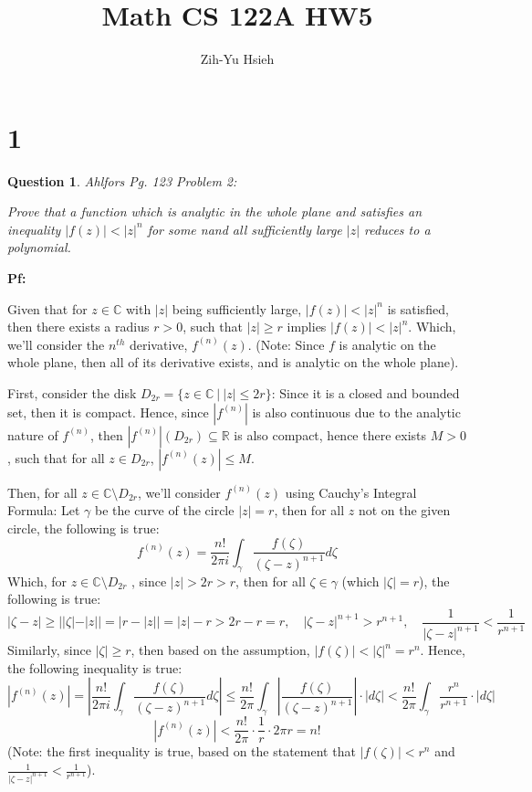 \documentclass{article}
\title{Math CS 122A HW5}
\author{Zih-Yu Hsieh}
\newtheorem{question}{Question}
\begin{document}
\maketitle

\section*{1}
\begin{myBox}[]{}
    \begin{question}
        Ahlfors Pg. 123 Problem 2:

        Prove that a function which is analytic in the whole plane and
        satisfies an inequality $|f(z)| < |z|^n$ for some nand all sufficiently large $|z|$
        reduces to a polynomial.
    \end{question}
\end{myBox}

\textbf{Pf:}

Given that for $z\in\mathbb{C}$ with $|z|$ being sufficiently large, $|f(z)|< |z|^n$ is satisfied, 
then there exists a radius $r>0$, such that $|z|\geq r$ implies $|f(z)|<|z|^n$. Which, we'll consider the $n^{th}$ derivative,
$f^{(n)}(z)$. (Note: Since $f$ is analytic on the whole plane, then all of its derivative exists, and is analytic on the whole plane).

\hfill

First, consider the disk $D_{2r} = \{z\in\mathbb{C}\ |\ |z|\leq 2r\}$: Since it is a closed and bounded set,
then it is compact. Hence, since $|f^{(n)}|$ is also continuous due to the analytic nature of $f^{(n)}$, 
then $|f^{(n)}|(D_{2r}) \subseteq \mathbb{R}$ is also compact, hence there exists $M>0$, such that for all $z\in D_{2r}$,
$|f^{(n)}(z)| \leq M$.

\hfill

Then, for all $z\in \mathbb{C}\setminus D_{2r}$, we'll consider $f^{(n)}(z)$ using Cauchy's Integral Formula:
Let $\gamma$ be the curve of the circle $|z|=r$, then for all $z$ not on the given circle, the following is true:
$$f^{(n)}(z) = \frac{n!}{2\pi i}\int_{\gamma}\frac{f(\zeta)}{(\zeta-z)^{n+1}}d\zeta$$
Which, for $z\in \mathbb{C}\setminus D_{2r}$ , since $|z| > 2r > r$, then for all $\zeta \in \gamma$ (which $|\zeta|=r$), the following is true:
$$|\zeta-z| \geq ||\zeta|-|z|| = |r-|z|| = |z|-r > 2r-r = r,\quad |\zeta-z|^{n+1}> r^{n+1},\quad \frac{1}{|\zeta-z|^{n+1}} < \frac{1}{r^{n+1}}$$
Similarly, since $|\zeta|\geq r$, then based on the assumption, $|f(\zeta)| < |\zeta|^n = r^n$.
Hence, the following inequality is true:
$$|f^{(n)}(z)| = \left|\frac{n!}{2\pi i}\int_{\gamma}\frac{f(\zeta)}{(\zeta-z)^{n+1}}d\zeta\right| \leq \frac{n!}{2\pi}\int_{\gamma}\left|\frac{f(\zeta)}{(\zeta-z)^{n+1}}\right|\cdot|d\zeta| < \frac{n!}{2\pi}\int_{\gamma}\frac{r^n}{r^{n+1}}\cdot|d\zeta|$$
$$|f^{(n)}(z)| < \frac{n!}{2\pi}\cdot\frac{1}{r}\cdot 2\pi r = n!$$
(Note: the first inequality is true, based on the statement that $|f(\zeta)|< r^n$ and $\frac{1}{|\zeta-z|^{n+1}}<\frac{1}{r^{n+1}}$).
\end{document}
